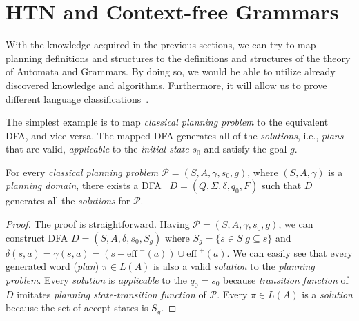\section{HTN and Context-free Grammars}

\medskip\noindent
With the knowledge acquired in the previous sections, we can try to map planning definitions and structures to the definitions and structures of the theory of Automata and Grammars. By doing so, we would be able to utilize already discovered knowledge and algorithms. Furthermore, it will allow us to prove different language classifications~\cite{langclassification}.

\medskip\noindent
The simplest example is to map \emph{classical planning problem} to the equivalent DFA, and vice versa. The mapped DFA generates all of the \emph{solutions}, i.e., \emph{plans} that are valid, \emph{applicable} to the \emph{initial state} $s_0$ and satisfy the goal $g$.

\begin{thm}\label{thm02:1}
    For every \emph{classical planning problem $\mathcal{P} = (S, A, \gamma, s_0, g)$}, where $(S, A, \gamma)$ is a \emph{planning domain}, there exists a DFA~\cite{chytil} $D = (Q, \Sigma, \delta, q_0, F)$ such that $D$ generates all the \emph{solutions} for $\mathcal{P}$.
\end{thm}
\begin{proof}
    The proof is straightforward. Having $\mathcal{P} = (S, A, \gamma, s_0, g)$, we can construct DFA $D = (S,A,\delta,s_0,S_g)$ where $S_g=\{s \in S | g \subseteq s\}$ and $\delta(s,a) = \gamma(s, a) = (s-\text{eff}^{\,\,-}(a)) \cup \text{eff}^{\,\,+}(a)$. We can easily see that every generated word (\emph{plan}) $\pi \in L(A)$ is also a valid \emph{solution} to the \emph{planning problem}. Every \emph{solution} is \emph{applicable} to the $q_0 = s_0$ because \emph{transition function} of $D$ imitates \emph{planning state-transition function} of $\mathcal{P}$. Every $\pi \in L(A)$ is a \emph{solution} because the set of accept states is $S_g$.
\end{proof}

